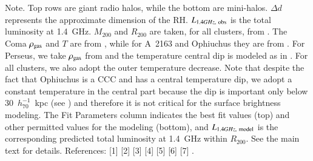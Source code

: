 \documentclass[traditabstract]{aa}
\begin{document}
\begin{table}[hbt!]
\begin{center}
\label{tab:RadioHalos}
\end{center}
\footnotesize{Note. Top rows are giant radio halos, while the bottom are mini-halos. $\Delta d$ represents the approximate dimension of the RH. $L_{1.4 GHz,~\rm{obs}}$ is the total luminosity at 1.4~GHz. $M_{200}$ and $R_{200}$ are taken, for all clusters, from \cite{2002ApJ...567..716R}. The Coma $\rho_{\rm{gas}}$ and $T$ are from \cite{1992A&A...259L..31B}, while for A~2163 and Ophiuchus they are from \cite{2002ApJ...567..716R}. For Perseus, we take $\rho_{\rm{gas}}$ from \cite{2003ApJ...590..225C} and the temperature central dip is modeled as in \cite{2004A&A...413...17P}. For all clusters, we also adopt the outer temperature decrease. Note that despite the fact that Ophiuchus is a CCC and has a central temperature dip, we adopt a constant temperature in the central part because the dip is important only below $30$~$h_{70}^{-1}$~kpc (see \citealp{2010MNRAS.405.1624M}) and therefore it is not critical for the surface brightness modeling. The Fit Parameters column indicates the best fit values (top) and other permitted values for the modeling (bottom), and $L_{1.4 GHz,~\rm{model}}$ is the corresponding predicted total luminosity at 1.4~GHz within $R_{200}$. See the main text for details. References: [1] \cite{1997A&A...321...55D} [2] \cite{1992A&A...259L..31B} [3] \cite{2002ApJ...567..716R} [4] \cite{2009A&A...499..679M} [5] \cite{1990MNRAS.246..477P} [6] \cite{2003ApJ...590..225C} [7] \cite{2004A&A...413...17P}.}
\end{table}
\end{document}
